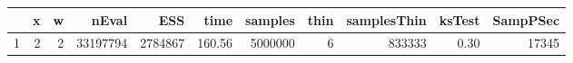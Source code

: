 \begin{table}[h]
\centering
\begingroup\tiny
\begin{tabular}{rrrrrrrrrrr}
  \hline
 & x & w & nEval & ESS & time & samples & thin & samplesThin & ksTest & SampPSec \\ 
  \hline
1 & 2 & 2 & 33197794 & 2784867 & 160.56 & 5000000 & 6 & 833333 & 0.30 & 17345 \\ 
   \hline
\end{tabular}
\endgroup
\end{table}

